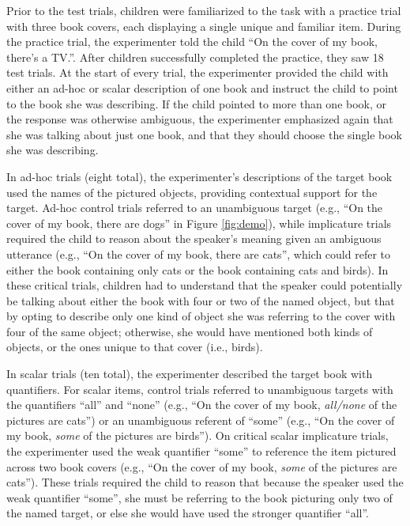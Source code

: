 \documentclass[man]{apa2}
\begin{document}
Prior to the test trials, children were familiarized to the task with a practice trial with three book covers, each displaying a single unique and familiar item. During the practice trial, the experimenter told the child ``On the cover of my book, there's a TV.''. After children successfully completed the practice, they saw 18 test trials. At the start of every trial, the experimenter provided the child with either an ad-hoc or scalar description of one book and instruct the child to point to the book she was describing. If the child pointed to more than one book, or the response was otherwise ambiguous, the experimenter emphasized again that she was talking about just one book, and that they should choose the single book she was describing. 

In ad-hoc trials (eight total), the experimenter's descriptions of the target book used the names of the pictured objects, providing contextual support for the target. Ad-hoc control trials referred to an unambiguous target (e.g., ``On the cover of my book, there are dogs'' in Figure \ref{fig:demo}), while implicature trials required the child to reason about the speaker's meaning given an ambiguous utterance (e.g., ``On the cover of my book, there are cats'', which could refer to either the book containing only cats or the book containing cats and birds). In these critical trials, children had to understand that the speaker could potentially be talking about either the book with four or two of the named object, but that by opting to describe only one kind of object she was referring to the cover with four of the same object; otherwise, she would have mentioned both kinds of objects, or the ones unique to that cover (i.e., birds). 

In scalar trials (ten total), the experimenter described the target book with quantifiers. For scalar items, control trials referred to unambiguous targets with the quantifiers ``all'' and ``none'' (e.g., ``On the cover of my book, \textit{all/none} of the pictures are cats'') or an unambiguous referent of ``some'' (e.g., ``On the cover of my book, \textit{some} of the pictures are birds''). On critical scalar implicature trials, the experimenter used the weak quantifier ``some'' to reference the item pictured across two book covers (e.g., ``On the cover of my book, \textit{some} of the pictures are cats''). These trials required the child to reason that because the speaker used the weak quantifier ``some'', she must be referring to the book picturing only two of the named target, or else she would have used the stronger quantifier ``all''. 
\end{document}
